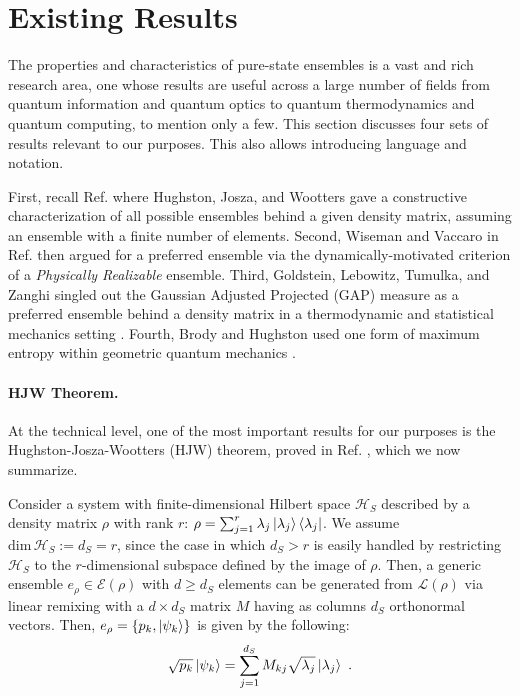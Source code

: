 \documentclass[draft,nofootinbib,pre,twocolumn,showpacs,showkeys,groupaddress,preprintnumbers,floatfix]{revtex4-1}
\newcommand{\1}{\mathbbm{1}}
\begin{document}
\section{Existing Results}
\label{sec:PreviousResults}

The properties and characteristics of pure-state ensembles is a vast and rich
research area, one whose results are useful across a large number of fields from
quantum information and quantum optics to quantum thermodynamics and quantum
computing, to mention only a few. This section discusses four sets of results
relevant to our purposes. This also allows introducing language and notation. 

First, recall Ref. \cite{HJW93} where Hughston, Josza, and Wootters gave a
constructive characterization of all possible ensembles behind a given density
matrix, assuming an ensemble with a finite number of elements. Second, Wiseman 
and Vaccaro in Ref. \cite{Wise01} then argued for a preferred ensemble via the 
dynamically-motivated criterion of a \emph{Physically Realizable} ensemble. Third, 
Goldstein, Lebowitz, Tumulka, and Zanghi singled out the Gaussian Adjusted 
Projected (GAP) measure as a preferred ensemble behind a density matrix in a 
thermodynamic and statistical mechanics setting \cite{Gold06}. Fourth, Brody and 
Hughston used one form of maximum entropy within geometric quantum 
mechanics \cite{Brody2000}. 

\paragraph*{HJW Theorem.} At the technical level, one of the most important
results for our purposes is the Hughston-Josza-Wootters (HJW) theorem, proved
in Ref. \cite{HJW93}, which we now summarize.

Consider a system with finite-dimensional Hilbert space $\mathcal{H}_S$
described by a density matrix $\rho$ with rank $r$: $\rho=
\sum_{j=1}^{r}\lambda_j \ket{\lambda_j}\bra{\lambda_j}$. We assume
$\mathrm{dim} \, \mathcal{H}_S := d_S = r$, since the case in which $d_S > r$
is easily handled by restricting $\mathcal{H}_S$ to the $r$-dimensional
subspace defined  by the image of $\rho$. Then, a generic ensemble $e_\rho \in
\mathcal{E}(\rho)$ with $d \geq d_S$ elements can be generated from
$\mathcal{L}(\rho)$ via linear remixing with a $d \times d_S$ matrix $M$ having
as columns $d_S$ orthonormal vectors. Then, $e_\rho = \left\{
p_k,\ket{\psi_k}\right\}$ is given by the following:
\begin{align*}
\sqrt{p_k}\ket{\psi_k} = \sum_{j=1}^{d_S}M_{kj}\sqrt{\lambda_j}\ket{\lambda_j}
  ~.
\end{align*}
\end{document}
